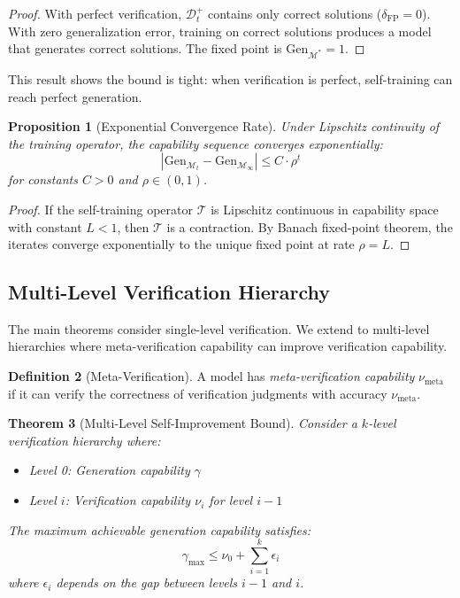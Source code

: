 \documentclass{article}
\newtheorem{theorem}{Theorem}
\newtheorem{proposition}[theorem]{Proposition}
\theoremstyle{definition}
\newtheorem{definition}[theorem]{Definition}
\theoremstyle{remark}
\newcommand{\M}{\mathcal{M}}
\newcommand{\D}{\mathcal{D}}
\newcommand{\T}{\mathcal{T}}
\newcommand{\Gen}{\text{Gen}}
\begin{document}
\begin{proof}
With perfect verification, \(\D_t^+\) contains only correct solutions (\(\delta_{\text{FP}} = 0\)). With zero generalization error, training on correct solutions produces a model that generates correct solutions. The fixed point is \(\Gen_{\M^*} = 1\).
\end{proof}

This result shows the bound is tight: when verification is perfect, self-training can reach perfect generation.

\begin{proposition}[Exponential Convergence Rate]
\label{prop:convergence-rate}
Under Lipschitz continuity of the training operator, the capability sequence converges exponentially:
\[
|\Gen_{\M_t} - \Gen_{\M_\infty}| \leq C \cdot \rho^t
\]
for constants \(C > 0\) and \(\rho \in (0, 1)\).
\end{proposition}

\begin{proof}
If the self-training operator \(\T\) is Lipschitz continuous in capability space with constant \(L < 1\), then \(\T\) is a contraction. By Banach fixed-point theorem, the iterates converge exponentially to the unique fixed point at rate \(\rho = L\).
\end{proof}

\subsection{Multi-Level Verification Hierarchy}

The main theorems consider single-level verification. We extend to multi-level hierarchies where meta-verification capability can improve verification capability.

\begin{definition}[Meta-Verification]
\label{def:meta-verification}
A model has \emph{meta-verification capability} \(\nu_{\text{meta}}\) if it can verify the correctness of verification judgments with accuracy \(\nu_{\text{meta}}\).
\end{definition}

\begin{theorem}[Multi-Level Self-Improvement Bound]
\label{thm:multi-level}
Consider a \(k\)-level verification hierarchy where:
\begin{itemize}
\item Level 0: Generation capability \(\gamma\)
\item Level \(i\): Verification capability \(\nu_i\) for level \(i-1\)
\end{itemize}

The maximum achievable generation capability satisfies:
\[
\gamma_{\max} \leq \nu_0 + \sum_{i=1}^{k} \epsilon_i
\]
where \(\epsilon_i\) depends on the gap between levels \(i-1\) and \(i\).
\end{theorem}
\end{document}
